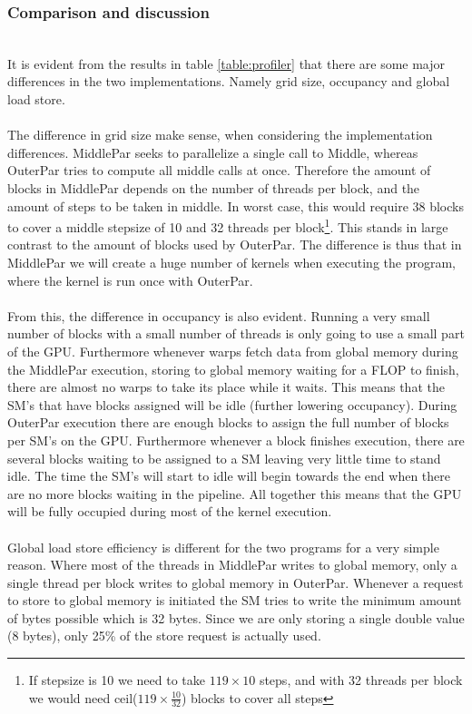 \subsubsection{Comparison and discussion} \hfill \\
It is evident from the results in table \ref{table:profiler} that there are some major differences in the two implementations. Namely grid size, occupancy and global load store.
\\ \\
The difference in grid size make sense, when considering the implementation differences. MiddlePar seeks to parallelize a single call to Middle, whereas OuterPar tries to compute all middle calls at once. Therefore the amount of blocks in MiddlePar depends on the number of threads per block, and the amount of steps to be taken in middle. In worst case, this would require 38 blocks to cover a middle stepsize of 10 and 32 threads per block\footnote{If stepsize is 10 we need to take $119 \times 10$ steps, and with 32 threads per block we would need ceil($119 \times \frac{10}{32}$) blocks to cover all steps}. This stands in large contrast to the amount of blocks used by OuterPar. The difference is thus that in MiddlePar we will create a huge number of kernels when executing the program, where the kernel is run once with OuterPar.
\\ \\
From this, the difference in occupancy is also evident. Running a very small number of blocks with a small number of threads is only going to use a small part of the GPU. Furthermore whenever warps fetch data from global memory during the MiddlePar execution, storing to global memory waiting for a FLOP to finish, there are almost no warps to take its place while it waits. This means that the SM's that have blocks assigned will be idle (further lowering occupancy). During OuterPar execution there are enough blocks to assign the full number of blocks per SM's on the GPU. Furthermore whenever a block finishes execution, there are several blocks waiting to be assigned to a SM leaving very little time to stand idle. The time the SM's will start to idle will begin towards the end when there are no more blocks waiting in the pipeline. All together this means that the GPU will be fully occupied during most of the kernel execution.
\\ \\
Global load store efficiency is different for the two programs for a very simple reason. Where most of the threads in MiddlePar writes to global memory, only a single thread per block writes to global memory in OuterPar. Whenever a request to store to global memory is initiated the SM tries to write the minimum amount of bytes possible which is 32 bytes. Since we are only storing a single double value (8 bytes), only 25\% of the store request is actually used.

